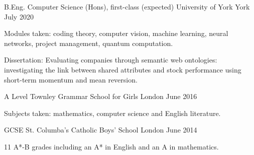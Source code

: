 
\begin{cventries}
  \cventry
    {B.Eng. Computer Science (Hons), first-class (expected)} %
    {University of York} %
    {York} %
    {July 2020} %
    {
      \begin{cvitems} %
         \item {Modules taken: coding theory, computer vision, machine learning, neural networks, project management, quantum computation.}
         \vspace{0.5mm}
         \item {Dissertation: Evaluating companies through semantic web ontologies: investigating the link between shared attributes and stock performance using short-term momentum and mean reversion.}
      \end{cvitems}
    }

  \cventry
    {A Level} %
    {Townley Grammar School for Girls} %
    {London} %
    {June 2016} %
    {
      \begin{cvitems} %
      \item {Subjects taken: mathematics, computer science and English literature.}
      \end{cvitems}
    }

  \cventry
    {GCSE} %
    {St. Columba’s Catholic Boys' School} %
    {London} %
    {June 2014} %
    {
      \begin{cvitems} %
      \item {11 A*-B grades including an A* in English and an A in mathematics.}
      \end{cvitems}
    }
\end{cventries}
